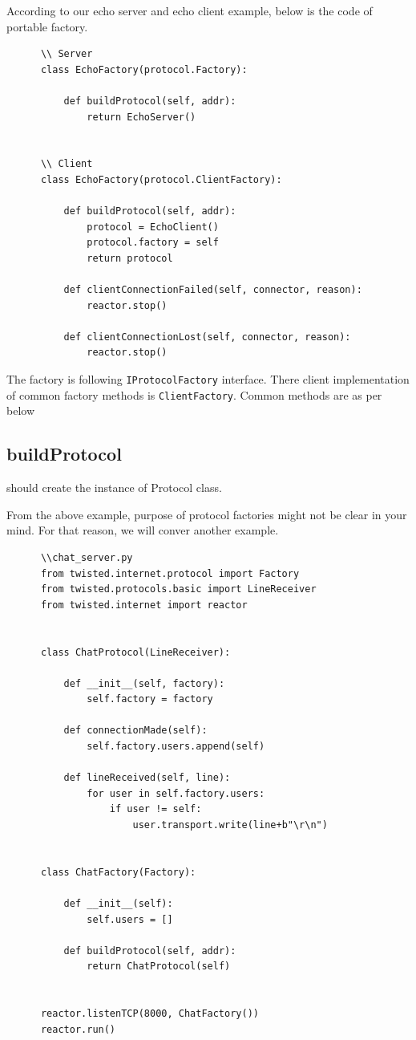 \documentclass{article}
\begin{document}
    According to our echo server and echo client example, below is the code of
    portable factory.

    \begin{verbatim}
      \\ Server
      class EchoFactory(protocol.Factory):

          def buildProtocol(self, addr):
              return EchoServer()


      \\ Client
      class EchoFactory(protocol.ClientFactory):

          def buildProtocol(self, addr):
              protocol = EchoClient()
              protocol.factory = self
              return protocol

          def clientConnectionFailed(self, connector, reason):
              reactor.stop()

          def clientConnectionLost(self, connector, reason):
              reactor.stop()
    \end{verbatim}

    The factory is following \texttt{IProtocolFactory} interface. There client
    implementation of common factory methods is \texttt{ClientFactory}. Common
    methods are as per below

    \subsection{buildProtocol} should create the instance of Protocol class.

    From the above example, purpose of protocol factories might not be clear in
    your mind. For that reason, we will conver another example.

    \begin{verbatim}
      \\chat_server.py
      from twisted.internet.protocol import Factory
      from twisted.protocols.basic import LineReceiver
      from twisted.internet import reactor


      class ChatProtocol(LineReceiver):

          def __init__(self, factory):
              self.factory = factory

          def connectionMade(self):
              self.factory.users.append(self)

          def lineReceived(self, line):
              for user in self.factory.users:
                  if user != self:
                      user.transport.write(line+b"\r\n")


      class ChatFactory(Factory):

          def __init__(self):
              self.users = []

          def buildProtocol(self, addr):
              return ChatProtocol(self)


      reactor.listenTCP(8000, ChatFactory())
      reactor.run()

    \end{verbatim}
\end{document}
